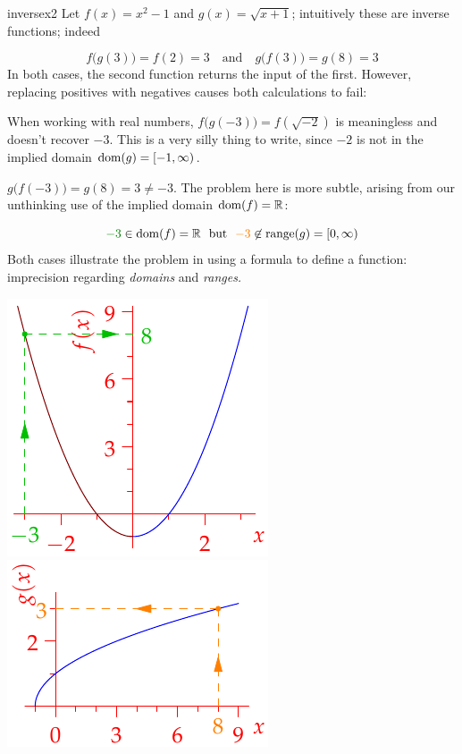 \begin{example}{}{inversex2}
Let $f(x)=x^2-1$ and $g(x)=\sqrt{x+1}$; intuitively these are inverse functions; indeed\par
\begin{minipage}[t]{0.7\linewidth}\vspace{-12pt}
\[f\bigl(g(3)\bigr)=f(2)=3\quad\text{and}\quad g\bigl(f(3)\bigr)=g(8)=3\]
In both cases, the second function returns the input of the first. However, replacing positives with negatives causes both calculations to fail:
\begin{enumeratea}
  \item When working with real numbers, $f\bigl(g(-3)\bigr)=f(\sqrt{-2})$ is meaningless and doesn't recover $-3$. This is a very silly thing to write, since $-2$ is not in the implied domain $\operatorname{dom}(g)=[-1,\infty)$.
  \item $g\bigl(f(-3)\bigr)=g(8)=3\neq -3$. The problem here is more subtle, arising from our unthinking use of the implied domain $\operatorname{dom}(f)=\mathbb{R}$:\vspace{-12pt}
\end{enumeratea}
  \[\textcolor{Green}{-3}\in\dom(f)=\R\ \text{ but }\ \textcolor{orange}{-3}\not\in\operatorname{range}(g)=[0,\infty)\]
Both cases illustrate the problem in using a formula to define a function: imprecision regarding \emph{domains} and \emph{ranges.}
\end{minipage}\hfill\begin{minipage}[t]{0.29\linewidth}\vspace{-5pt}
\flushright\includegraphics[scale=0.9]{inverses-poly3}\\
\includegraphics[scale=0.95]{inverses-poly2}

\end{minipage}
\end{example}
